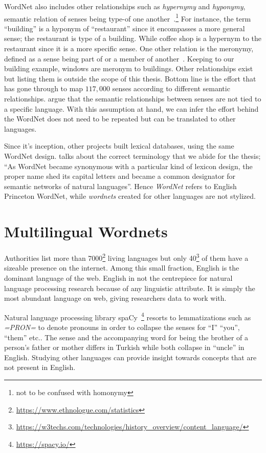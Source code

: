 WordNet also includes other relationships such as \emph{hypernymy} and \emph{hyponymy}, semantic relation of senses being type-of one another~\cite{miller_nouns_1990}.\footnote{not to be confused with homonymy}
For instance, the term \enquote{building} is a hyponym of \enquote{restaurant} since it encompasses a more general sense; the restaurant is type of a building.
While coffee shop is a hypernym to the restaurant since it is a more specific sense.
One other relation is the meronymy, defined as a sense being part of or a member of another~\cite{winston_taxonomy_1987}.
Keeping to our building example, windows are meronym to buildings.
Other relationships exist but listing them is outside the scope of this thesis.
Bottom line is the effort that has gone through to map $117,000$ senses according to different semantic relationships.
\textcite{sagot_building_2008} argue that the semantic relationships between senses are not tied to a specific language.
With this assumption at hand, we can infer the effort behind the WordNet does not need to be repeated but can be translated to other languages.

Since it's inception, other projects built lexical databases, using the same WordNet design.
\textcite{fellbaum_semantic_1998} talks about the correct terminology that we abide for the thesis; \enquote{As WordNet became synonymous with a particular kind of lexicon design, the proper name shed its capital letters and became a common designator for semantic networks of natural languages}.
Hence \emph{WordNet} refers to English Princeton WordNet, while \emph{wordnets} created for other languages are not stylized.

\section{Multilingual Wordnets}%
\label{sec:multilingual_wordnets}
Authorities list more than 7000\footnote{\url{https://www.ethnologue.com/statistics}} living languages but only 40\footnote{\url{https://w3techs.com/technologies/history_overview/content_language/}} of them have a sizeable presence on the internet.
Among this small fraction, English is the dominant language of the web.
English in not the centrepiece for natural language processing research because of any linguistic attribute.
It is simply the most abundant language on web, giving researchers data to work with.

Natural language processing library spaCy~\footnote{\url{https://spacy.io/}} resorts to lemmatizations such as \emph{=PRON=} to denote pronouns in order to collapse the senses for \enquote{I} \enquote{you}, \enquote{them} etc.\@.
The sense and the accompanying word for being the brother of a person's father or mother differs in Turkish while both collapse in \enquote{uncle} in English.
Studying other languages can provide insight towards concepts that are not present in English.

